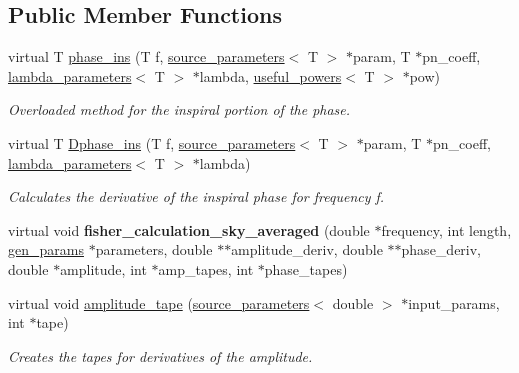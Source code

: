 \subsection*{Public Member Functions}
\begin{DoxyCompactItemize}
\item 
\mbox{\label{classppE__IMRPhenomD__Inspiral_a3187c9dba10e42f0bf20fb1e3bac9a52}} 
virtual T \hyperlink{classppE__IMRPhenomD__Inspiral_a3187c9dba10e42f0bf20fb1e3bac9a52}{phase\+\_\+ins} (T f, \hyperlink{structsource__parameters}{source\+\_\+parameters}$<$ T $>$ $\ast$param, T $\ast$pn\+\_\+coeff, \hyperlink{structlambda__parameters}{lambda\+\_\+parameters}$<$ T $>$ $\ast$lambda, \hyperlink{structuseful__powers}{useful\+\_\+powers}$<$ T $>$ $\ast$pow)
\begin{DoxyCompactList}\small\item\em Overloaded method for the inspiral portion of the phase. \end{DoxyCompactList}\item 
virtual T \hyperlink{classppE__IMRPhenomD__Inspiral_ae297c077497d34a2632c55a7dafb9e83}{Dphase\+\_\+ins} (T f, \hyperlink{structsource__parameters}{source\+\_\+parameters}$<$ T $>$ $\ast$param, T $\ast$pn\+\_\+coeff, \hyperlink{structlambda__parameters}{lambda\+\_\+parameters}$<$ T $>$ $\ast$lambda)
\begin{DoxyCompactList}\small\item\em Calculates the derivative of the inspiral phase for frequency f. \end{DoxyCompactList}\item 
\mbox{\label{classppE__IMRPhenomD__Inspiral_ab6fe831f7c11840235dac2433ba14f82}} 
virtual void {\bfseries fisher\+\_\+calculation\+\_\+sky\+\_\+averaged} (double $\ast$frequency, int length, \hyperlink{classgen__params}{gen\+\_\+params} $\ast$parameters, double $\ast$$\ast$amplitude\+\_\+deriv, double $\ast$$\ast$phase\+\_\+deriv, double $\ast$amplitude, int $\ast$amp\+\_\+tapes, int $\ast$phase\+\_\+tapes)
\item 
virtual void \hyperlink{classppE__IMRPhenomD__Inspiral_a87474cac9d6086d5625f79e28970b5ed}{amplitude\+\_\+tape} (\hyperlink{structsource__parameters}{source\+\_\+parameters}$<$ double $>$ $\ast$input\+\_\+params, int $\ast$tape)
\begin{DoxyCompactList}\small\item\em Creates the tapes for derivatives of the amplitude. \end{DoxyCompactList}\item 

\end{DoxyCompactItemize}
